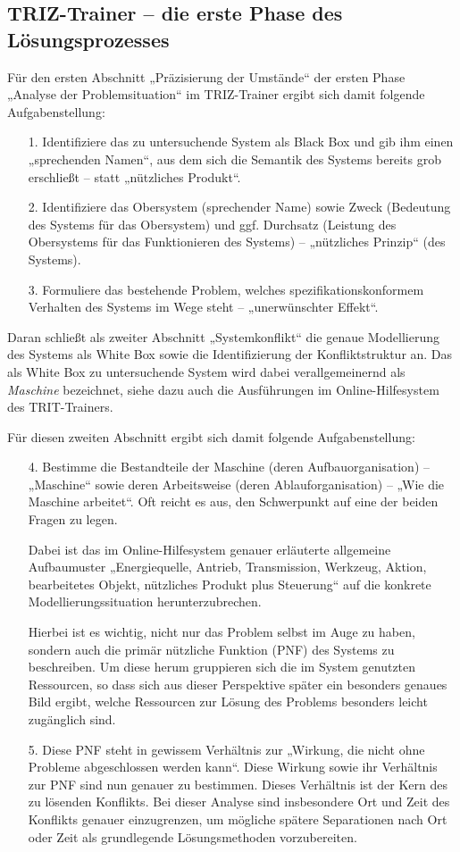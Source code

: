 \documentclass[11pt,a4paper]{article}
\begin{document}
\subsection*{TRIZ-Trainer -- die erste Phase des Lösungsprozesses}

Für den ersten Abschnitt „Präzisierung der Umstände“ der ersten Phase „Analyse
der Problemsituation“ im TRIZ-Trainer ergibt sich damit folgende
Aufgabenstellung:
\begin{itemize}
\item [1.] Identifiziere das zu untersuchende System als Black Box und gib ihm
  einen „sprechenden Namen“, aus dem sich die Semantik des Systems bereits
  grob erschließt -- statt „nützliches Produkt“. 
\item [2.] Identifiziere das Obersystem (sprechender Name) sowie Zweck
  (Bedeutung des Systems für das Obersystem) und ggf. Durchsatz (Leistung des
  Obersystems für das Funktionieren des Systems) -- „nützliches Prinzip“ (des
  Systems). 
\item [3.] Formuliere das bestehende Problem, welches spezifikationskonformem
  Verhalten des Systems im Wege steht -- „unerwünschter Effekt“.
\end{itemize}
Daran schließt als zweiter Abschnitt „Systemkonflikt“ die genaue Modellierung
des Systems als White Box sowie die Identifizierung der Konfliktstruktur an.
Das als White Box zu untersuchende System wird dabei verallgemeinernd als
\emph{Maschine} bezeichnet, siehe dazu auch die Ausführungen im
Online-Hilfesystem des TRIT-Trainers.

Für diesen zweiten Abschnitt ergibt sich damit folgende Aufgabenstellung:
\begin{itemize}
\item [4.] Bestimme die Bestandteile der Maschine (deren Aufbauorganisation)
  -- „Maschine“ sowie deren Arbeitsweise (deren Ablauforganisation) -- „Wie
  die Maschine arbeitet“. Oft reicht es aus, den Schwerpunkt auf eine der
  beiden Fragen zu legen.

  Dabei ist das im Online-Hilfesystem genauer erläuterte allgemeine
  Aufbaumuster „Energiequelle, Antrieb, Transmission, Werkzeug, Aktion,
  bearbeitetes Objekt, nützliches Produkt plus Steuerung“ auf die konkrete
  Modellierungssituation herunterzubrechen.
  
  Hierbei ist es wichtig, nicht nur das Problem selbst im Auge zu haben,
  sondern auch die primär nützliche Funktion (PNF) des Systems zu beschreiben.
  Um diese herum gruppieren sich die im System genutzten Ressourcen, so dass
  sich aus dieser Perspektive später ein besonders genaues Bild ergibt, welche
  Ressourcen zur Lösung des Problems besonders leicht zugänglich sind. 

\item [5.] Diese PNF steht in gewissem Verhältnis zur „Wirkung, die nicht ohne
  Probleme abgeschlossen werden kann“. Diese Wirkung sowie ihr Verhältnis zur
  PNF sind nun genauer zu bestimmen. Dieses Verhältnis ist der Kern des zu
  lösenden Konflikts.  Bei dieser Analyse sind insbesondere Ort und Zeit des
  Konflikts genauer einzugrenzen, um mögliche spätere Separationen nach Ort
  oder Zeit als grundlegende Lösungsmethoden vorzubereiten. 
\end{itemize}
\end{document}
